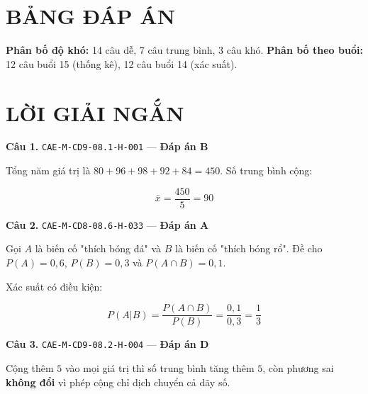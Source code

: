 \documentclass[11pt, a4paper]{article}
\begin{document}

\section{BẢNG ĐÁP ÁN}


\textbf{Phân bố độ khó:} 14 câu dễ, 7 câu trung bình, 3 câu khó.
\textbf{Phân bố theo buổi:} 12 câu buổi 15 (thống kê), 12 câu buổi 14 (xác suất).

\section{LỜI GIẢI NGẮN}

\textbf{Câu 1.} \texttt{CAE-M-CD9-08.1-H-001} — \textbf{Đáp án B}

Tổng năm giá trị là $80 + 96 + 98 + 92 + 84 = 450$. Số trung bình cộng:

$$\bar{x} = \frac{450}{5} = 90$$

\textbf{Câu 2.} \texttt{CAE-M-CD8-08.6-H-033} — \textbf{Đáp án A}

Gọi $A$ là biến cố "thích bóng đá" và $B$ là biến cố "thích bóng rổ". Đề cho $P(A) = 0,6$, $P(B) = 0,3$ và $P(A \cap B) = 0,1$.

Xác suất có điều kiện:

$$P(A|B) = \frac{P(A \cap B)}{P(B)} = \frac{0,1}{0,3} = \frac{1}{3}$$

\textbf{Câu 3.} \texttt{CAE-M-CD9-08.2-H-004} — \textbf{Đáp án D}

Cộng thêm $5$ vào mọi giá trị thì số trung bình tăng thêm $5$, còn phương sai \textbf{không đổi} vì phép cộng chỉ dịch chuyển cả dãy số.
\end{document}
